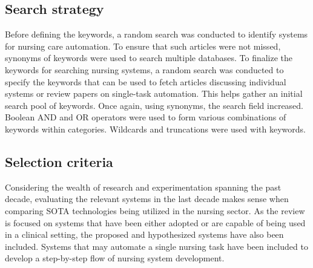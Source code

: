 \subsection{Search strategy}
Before defining the keywords, a random search was conducted to identify systems for nursing care automation. To ensure that such articles were not missed, synonyms of keywords were used to search multiple databases. To finalize the keywords for searching nursing systems, a random search was conducted to specify the keywords that can be used to fetch articles discussing individual systems or review papers on single-task automation. This helps gather an initial search pool of keywords. Once again, using synonyms, the search field increased. Boolean AND and OR operators were used to form various combinations of keywords within categories. Wildcards and truncations were used with keywords. 

\subsection{Selection criteria}
Considering the wealth of research and experimentation spanning the past decade, evaluating the relevant systems in the last decade makes sense when comparing SOTA technologies being utilized in the nursing sector.
As the review is focused on systems that have been either adopted or are capable of being used in a clinical setting, the proposed and hypothesized systems have also been included. Systems that may automate a single nursing task have been included to develop a step-by-step flow of nursing system development.

